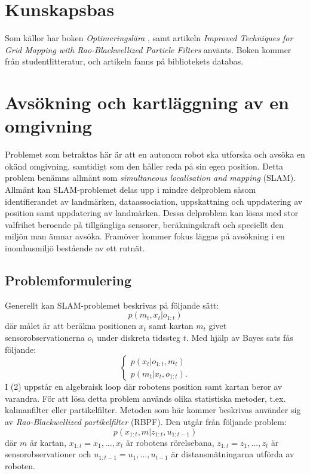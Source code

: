 \documentclass[11pt]{article}
\begin{document}
	\section{Kunskapsbas}
	Som källor har boken \textit{Optimeringslära} \autocite{lund-03}, samt artikeln \textit{Improved Techniques for Grid Mapping with Rao-Blackwellized Particle Filters} \autocite{gris-07} använts. Boken kommer från studentlitteratur, och artikeln fanns på bibliotekets databas.%
	
	\pagebreak
	
	\section{Avsökning och kartläggning av en omgivning} 
	
	
	Problemet som betraktas här är att en autonom robot ska utforska och avsöka en okänd omgivning, samtidigt som den håller reda på sin egen position. Detta problem benämns allmänt som \textit{simultaneous localisation and mapping} (SLAM). Allmänt kan SLAM-problemet delas upp i mindre delproblem såsom identifierandet av landmärken, dataassociation, uppskattning och uppdatering av position samt uppdatering av landmärken. Dessa delproblem kan lösas med stor valfrihet beroende på tillgängliga sensorer, beräkningskraft och speciellt den miljön man ämnar avsöka. Framöver kommer fokus läggas på avsökning i en inomhusmiljö bestående av ett rutnät. \autocite{gris-07}
	
	
	\subsection{Problemformulering}
	Generellt kan SLAM-problemet beskrivas på följande sätt:
	\begin{equation}
	p(m_{t},x_{t}|o_{1:t})
	\end{equation}
	där målet är att beräkna positionen $x_{t}$ samt kartan $m_{t}$ givet sensorobservationerna $o_{t}$ under diskreta tidssteg $t$. Med hjälp av Bayes sats fås följande:
	\begin{equation}
	\left\{\begin{matrix}
        p(x_{t}|o_{1:t},m_{t})\\
        p(m_{t}|x_{t},o_{1:t}).
        \end{matrix}\right.
	\end{equation}
	I (2) uppstår en algebraisk loop där robotens position samt kartan beror av varandra. För att lösa detta problem används olika statistiska metoder, t.ex. kalmanfilter eller partikelfilter. Metoden som här kommer beskrivas använder sig av \textit{Rao-Blackwellized partikelfilter} (RBPF). Den utgår från följande problem:
	\begin{equation}
	p(x_{1:t},m|z_{1:t},u_{1:t-1})
	\end{equation}
där $m$ är kartan, $x_{1:t}=x_{1},...,x_{t}$ är robotens rörelsebana,  $z_{1:t}=z_{1},...,z_{t}$ är sensorobservationer och $u_{1:t-1}=u_{1},...,u_{t-1}$ är distansmätningarna utförda av roboten.
\end{document}

